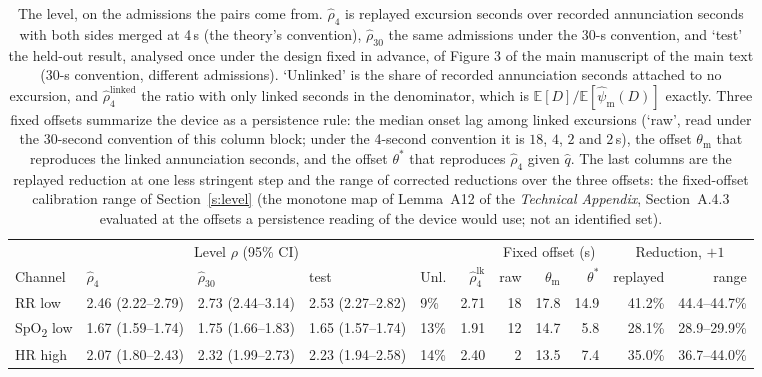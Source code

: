 \documentclass[11pt,letterpaper]{article}
\newcommand{\SpO}{SpO\textsubscript{2}}\newcommand{\tightnote}[1]{\par\smallskip{\footnotesize\raggedright #1\par}}
\begin{document}
\begin{table}[htbp]\centering\scriptsize
\setlength{\tabcolsep}{2.6pt}
\caption{The level, on the admissions the pairs come from. $\hat\rho_4$ is replayed excursion seconds over
recorded annunciation seconds with both sides merged at 4\,s (the theory's convention), $\hat\rho_{30}$ the
same admissions under the 30-s convention, and `test' the held-out result, analysed once under the design fixed in advance, of
Figure 3 of the main manuscript of the main text (30-s convention, different admissions). `Unlinked' is the share of recorded
annunciation seconds attached to no excursion, and $\hat\rho_4^{\mathrm{linked}}$ the ratio with only
linked seconds in the denominator, which is $\mathbb E[D]/\mathbb E[\hat\psi_{\mathrm m}(D)]$ exactly.
Three fixed offsets summarize the device as a persistence rule: the median onset lag among linked
excursions (`raw', read under the 30-second convention of this column block; under the 4-second
convention it is $18$, $4$, $2$ and $2$\,s), the offset $\theta_{\mathrm m}$ that reproduces the linked annunciation seconds, and
the offset $\theta^\ast$ that reproduces $\hat\rho_4$ given $\hat q$. The last columns are the replayed
reduction at one less stringent step and the range of corrected reductions over the three offsets: the
fixed-offset calibration range of Section~\ref{s:level} (the monotone map of Lemma~A12 of the \emph{Technical Appendix}, Section~A.4.3
evaluated at the offsets a persistence reading of the device would use; not an identified set).}
\label{tab:level}
\begin{tabular}{@{}lllllrrrrrr@{}}
\toprule
 & \multicolumn{3}{c}{Level $\rho$ (95\% CI)} & & & \multicolumn{3}{c}{Fixed offset (s)} & \multicolumn{2}{c}{Reduction, $+1$} \\
\cmidrule(lr){2-4}\cmidrule(lr){7-9}\cmidrule(lr){10-11}
Channel & $\hat\rho_4$ & $\hat\rho_{30}$ & test & Unl. & $\hat\rho_4^{\mathrm{lk}}$ & raw & $\theta_{\mathrm m}$ & $\theta^\ast$ & replayed & range \\
\midrule
RR low & 2.46 (2.22--2.79) & 2.73 (2.44--3.14) & 2.53 (2.27--2.82) & 9\% & 2.71 & 18 & 17.8 & 14.9 & 41.2\% & 44.4--44.7\% \\
\SpO{} low & 1.67 (1.59--1.74) & 1.75 (1.66--1.83) & 1.65 (1.57--1.74) & 13\% & 1.91 & 12 & 14.7 & 5.8 & 28.1\% & 28.9--29.9\% \\
HR high & 2.07 (1.80--2.43) & 2.32 (1.99--2.73) & 2.23 (1.94--2.58) & 14\% & 2.40 & 2 & 13.5 & 7.4 & 35.0\% & 36.7--44.0\% \\

\end{tabular}
\end{table}
\end{document}
